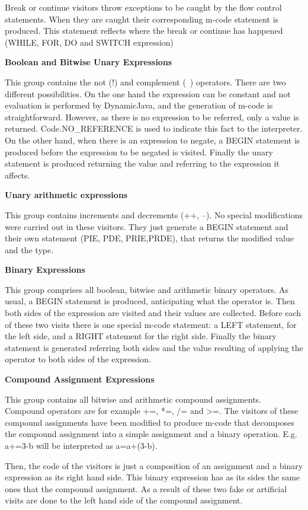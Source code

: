 Break or continue visitors throw exceptions to be caught by the flow control statements. When they are caught their corresponding m-code statement is produced. This statement reflects where the break or continue has happened (WHILE, FOR, DO and SWITCH expression)

{\bf{Boolean and Bitwise Unary Expressions}}

This group contains the not (!) and complement (~) operators. There are two different possibilities. On the one hand the expression can be constant and not evaluation is performed by DynamicJava, and the generation of m-code is straightforward. However, as there is no expression to be referred, only a value is returned. Code.NO\_REFERENCE is used to indicate this fact to the interpreter. On the other hand, when there is an expression to negate, a BEGIN statement is produced before the expression to be negated is visited. Finally the unary statement is produced returning the value and referring to the expression it affects.

{\bf{Unary arithmetic expressions}}

This group contains increments and decrements (++, --). No special modifications were carried out in these visitors. They just generate a BEGIN statement and their own statement (PIE, PDE, PRIE,PRDE), that returns the modified value and the type.

{\bf{Binary Expressions}}

This group comprises all boolean, bitwise and arithmetic binary operators. As usual, a BEGIN statement is produced, anticipating what the operator is. Then both sides of the expression are visited and their values are collected. Before each of these two visits there is one special m-code statement: a LEFT statement, for the left side, and a RIGHT statement for the right side. Finally the binary statement is generated referring both sides and the value resulting of applying the operator to both sides of the expression.

{\bf{Compound Assignment Expressions}}

This group contains all bitwise and arithmetic compound assignments. Compound operators are for example +=, *=, /= and >=. The visitors of these compound assignments have been modified to produce m-code that decomposes the compound assignment into a simple assignment and a binary operation. E.g. a+=3-b will be interpreted as a=a+(3-b).

Then, the code of the visitors is just a composition of an assignment and a binary expression as its right hand side. This binary expression has as its sides the same ones that the compound assignment. As a result of these two fake or artificial visits are done to the left hand side of the compound assignment.

